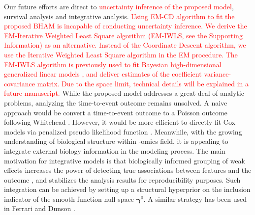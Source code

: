 \documentclass[AMA,STIX1COL,]{WileyNJD-v2}
\begin{document}
Our future efforts are direct to
\textcolor{red}{uncertainty inference of the proposed model}, survival
analysis and integrative analysis.
\textcolor{red}{Using EM-CD algorithm to fit the proposed BHAM is incapable of conducting uncertainty inference. We derive the EM-Iterative Weighted Least Square algorithm (EM-IWLS, see the Supporting Information) as an alternative. Instead of the Coordinate Descent algorithm, we use the Iterative Weighted Least Square algorithm in the EM procedure. The EM-IWLS algorithm is previously used to fit Bayesian high-dimensional generalized linear models \cite{Yi2012}, and deliver estimates of the coefficient variance-covariance matrix. Due to the space limit, technical details will be explained in a future manuscript.}
While the proposed model addresses a great deal of analytic problems,
analyzing the time-to-event outcome remains unsolved. A naive approach
would be convert a time-to-event outcome to a Poisson outcome following
Whitehead \citep{Whitehead1980}. However, it would be more efficient to
directly fit Cox models via penalized pseudo likelihood function
\citep{Simon2011}. Meanwhile, with the growing understanding of
biological structure within -omics field, it is appealing to integrate
external biology information in the modeling process. The main
motivation for integrative models is that biologically informed grouping
of weak effects increases the power of detecting true associations
between features and the outcome \citep{Peterson2016}, and stabilizes
the analysis results for reproducibility purposes. Such integration can
be achieved by setting up a structural hyperprior on the inclusion
indicator of the smooth function null space \(\boldsymbol{\gamma}^0\). A
similar strategy has been used in Ferrari and Dunson
\citep{Ferrari2020}.

\clearpage



\clearpage
\end{document}
